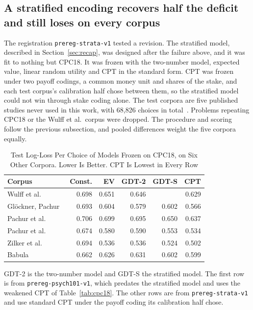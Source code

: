\documentclass[journal]{IEEEtran}
\begin{document}
\subsection{A stratified encoding recovers half the deficit and still loses on every corpus}
The registration \texttt{prereg-strata-v1} tested a revision.
The stratified model, described in Section~\ref{sec:recap}, was designed after the failure above, and it was fit to nothing but CPC18.
It was frozen with the two-number model, expected value, linear random utility and CPT in the standard form.
CPT was frozen under two payoff codings, a common money unit and shares of the stake, and each test corpus's calibration half chose between them, so the stratified model could not win through stake coding alone.
The test corpora are five published studies never used in this work, with 68{,}826 choices in total~\cite{glockner2012,pachur2017,pachur2018,zilker2020,babula2018}.
Problems repeating CPC18 or the Wulff et al.\ corpus were dropped.
The procedure and scoring follow the previous subsection, and pooled differences weight the five corpora equally.

\begin{table}[!t]
\renewcommand{\arraystretch}{1.15}
\caption{Test Log-Loss Per Choice of Models Frozen on CPC18, on Six Other Corpora. Lower Is Better. CPT Is Lowest in Every Row}
\label{tab:corpora}
\centering
\footnotesize
\begin{tabular}{@{}l r r r r r@{}}
\toprule
\textbf{Corpus} & \textbf{Const.} & \textbf{EV} & \textbf{GDT-2} & \textbf{GDT-S} & \textbf{CPT} \\
\midrule
Wulff et al.~\cite{wulff2018}      & 0.698 & 0.651 & 0.646 &       & 0.629 \\
Gl\"ockner, Pachur~\cite{glockner2012} & 0.693 & 0.604 & 0.579 & 0.602 & 0.566 \\
Pachur et al.~\cite{pachur2017}    & 0.706 & 0.699 & 0.695 & 0.650 & 0.637 \\
Pachur et al.~\cite{pachur2018}    & 0.674 & 0.580 & 0.590 & 0.553 & 0.534 \\
Zilker et al.~\cite{zilker2020}    & 0.694 & 0.536 & 0.536 & 0.524 & 0.502 \\
Babula~\cite{babula2018}           & 0.662 & 0.626 & 0.631 & 0.602 & 0.599 \\
\bottomrule
\end{tabular}
\begin{flushleft}
\footnotesize{GDT-2 is the two-number model and GDT-S the stratified model. The first row is from \texttt{prereg-psych101-v1}, which predates the stratified model and uses the weakened CPT of Table~\ref{tab:cpc18}. The other rows are from \texttt{prereg-strata-v1} and use standard CPT under the payoff coding its calibration half chose.}
\end{flushleft}
\end{table}
\end{document}
